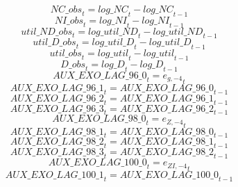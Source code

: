 \begin{dmath}
{NC\_obs}_{t}={log\_NC}_{t}-{log\_NC}_{t-1}
\end{dmath}
\begin{dmath}
{NI\_obs}_{t}={log\_NI}_{t}-{log\_NI}_{t-1}
\end{dmath}
\begin{dmath}
{util\_ND\_obs}_{t}={log\_util\_ND}_{t}-{log\_util\_ND}_{t-1}
\end{dmath}
\begin{dmath}
{util\_D\_obs}_{t}={log\_util\_D}_{t}-{log\_util\_D}_{t-1}
\end{dmath}
\begin{dmath}
{util\_obs}_{t}={log\_util}_{t}-{log\_util}_{t-1}
\end{dmath}
\begin{dmath}
{D\_obs}_{t}={log\_D}_{t}-{log\_D}_{t-1}
\end{dmath}
\begin{dmath}
{AUX\_EXO\_LAG\_96\_0}_{t}={{e_{g,-4}}}_{t}
\end{dmath}
\begin{dmath}
{AUX\_EXO\_LAG\_96\_1}_{t}={AUX\_EXO\_LAG\_96\_0}_{t-1}
\end{dmath}
\begin{dmath}
{AUX\_EXO\_LAG\_96\_2}_{t}={AUX\_EXO\_LAG\_96\_1}_{t-1}
\end{dmath}
\begin{dmath}
{AUX\_EXO\_LAG\_96\_3}_{t}={AUX\_EXO\_LAG\_96\_2}_{t-1}
\end{dmath}
\begin{dmath}
{AUX\_EXO\_LAG\_98\_0}_{t}={{e_{Z,-4}}}_{t}
\end{dmath}
\begin{dmath}
{AUX\_EXO\_LAG\_98\_1}_{t}={AUX\_EXO\_LAG\_98\_0}_{t-1}
\end{dmath}
\begin{dmath}
{AUX\_EXO\_LAG\_98\_2}_{t}={AUX\_EXO\_LAG\_98\_1}_{t-1}
\end{dmath}
\begin{dmath}
{AUX\_EXO\_LAG\_98\_3}_{t}={AUX\_EXO\_LAG\_98\_2}_{t-1}
\end{dmath}
\begin{dmath}
{AUX\_EXO\_LAG\_100\_0}_{t}={{e_{ZI,-4}}}_{t}
\end{dmath}
\begin{dmath}
{AUX\_EXO\_LAG\_100\_1}_{t}={AUX\_EXO\_LAG\_100\_0}_{t-1}
\end{dmath}
